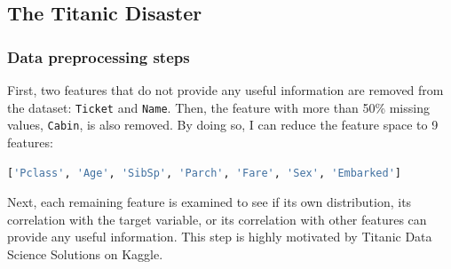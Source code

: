 \documentclass[10pt]{article}
\begin{document}
\subsection{The Titanic Disaster}

\subsubsection{Data preprocessing steps}

First, two features that do not provide any useful information are removed from the dataset: \texttt{Ticket} and \texttt{Name}. Then, the feature with more than 50\% missing values, \texttt{Cabin}, is also removed. By doing so, I can reduce the feature space to 9 features:

\begin{lstlisting}[language=Python]
['Pclass', 'Age', 'SibSp', 'Parch', 'Fare', 'Sex', 'Embarked']
\end{lstlisting}

Next, each remaining feature is examined to see if its own distribution, its correlation with the target variable, or its correlation with other features can provide any useful information. This step is highly motivated by Titanic Data Science Solutions on Kaggle.
\end{document}
